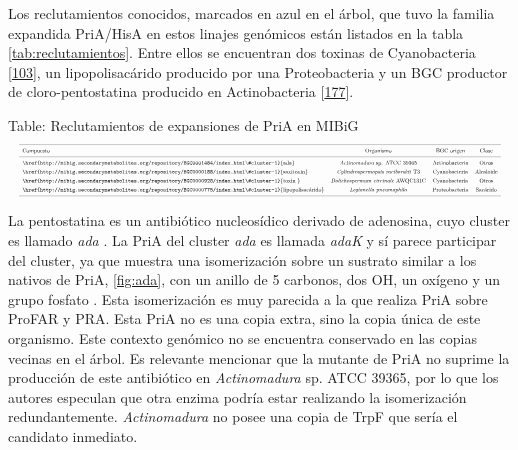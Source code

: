 \documentclass[12pt,twoside]{reedthesis}
\begin{document}
  Los reclutamientos conocidos, marcados en azul en el árbol, que tuvo la
  familia expandida PriA/HisA en estos linajes genómicos están listados en
  la tabla \autoref{tab:reclutamientos}. Entre ellos se encuentran dos
  toxinas de Cyanobacteria
  {[}\protect\hyperlink{ref-moustafa_origin_2009}{103}{]}, un
  lipopolisacárido producido por una Proteobacteria y un BGC productor de
  cloro-pentostatina producido en Actinobacteria
  {[}\protect\hyperlink{ref-gao_biosynthesis_2017}{177}{]}.
  
  Table: Reclutamientos de expansiones de PriA en MIBiG
  \label{tab:reclutamientos}\\
  \[
  \resizebox{\columnwidth}{!}{%
  \begin{tabular}{ l c c c}
  \hline \\ [-1.5ex]  
  Compuesto & Organismo & BGC origen & Clase \\ [1ex]  
  \hline \\ [-1.5ex]
  \href{http://mibig.secondarymetabolites.org/repository/BGC0001484/index.html\#cluster-1}{ada}&\textit{Actinomadura} sp. ATCC 39365&Actinobacteria& Otros      \\ [1ex]  
  \href{http://mibig.secondarymetabolites.org/repository/BGC0000188/index.html\#cluster-1}{saxitoxin}&\textit{Cylindrospermopsis~raciborskii} T3&Cyanobacteria&Alcaloide \\ [1ex]  
  \href{http://mibig.secondarymetabolites.org/repository/BGC0000928/index.html\#cluster-1}{toxin }&\textit{Dolichospermum~circinale} AWQC131C & Cyanobacteria & Otros    \\ [1ex]  
  \href{http://mibig.secondarymetabolites.org/repository/BGC0000775/index.html\#cluster-1}{lipopolisacárido}  &\textit{Legionella~pneumophila}    & Proteobacteria & Sac\'arido    \\ [1ex]  
  \hline
  \end{tabular}}
  \] \normalsize
  
  La pentostatina es un antibiótico nucleosídico derivado de adenosina,
  cuyo cluster es llamado \emph{ada} . La PriA del cluster \emph{ada} es
  llamada \emph{adaK} y sí parece participar del cluster, ya que muestra
  una isomerización sobre un sustrato similar a los nativos de PriA,
  \autoref{fig:ada}, con un anillo de 5 carbonos, dos OH, un oxígeno y un
  grupo fosfato . Esta isomerización es muy parecida a la que realiza PriA
  sobre ProFAR y PRA. Esta PriA no es una copia extra, sino la copia única
  de este organismo. Este contexto genómico no se encuentra conservado en
  las copias vecinas en el árbol. Es relevante mencionar que la mutante de
  PriA no suprime la producción de este antibiótico en \emph{Actinomadura}
  sp. ATCC 39365, por lo que los autores especulan que otra enzima podría
  estar realizando la isomerización redundantemente. \emph{Actinomadura}
  no posee una copia de TrpF que sería el candidato inmediato.
  
\end{document}
